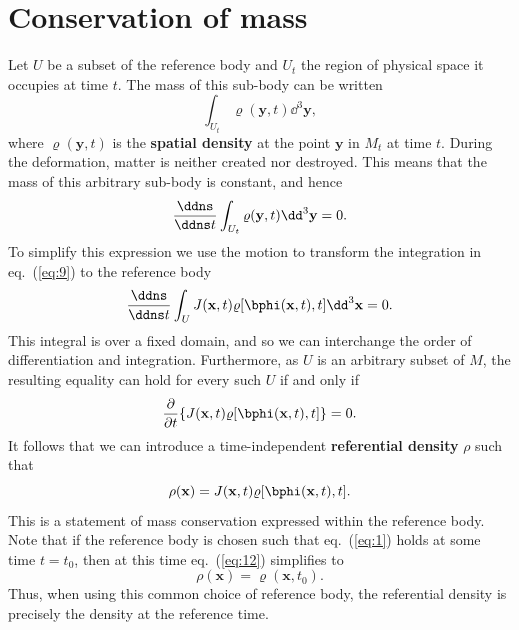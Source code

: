 \section*{Conservation of mass}
Let $U$ be a subset of the reference body and $U_{t}$ the region of physical space it occupies at time $t$. The mass of this 
sub-body can be written
\begin{equation}
\int_{U_{t}}\varrho(\mathbf{y},t)\dd^{3}\mathbf{y},
\label{eq:8}
\end{equation}
where $\varrho(\mathbf{y},t)$ is the \textbf{spatial density} at the point $\mathbf{y}$ in $M_{t}$ at time $t$. During the deformation, matter is 
neither created nor destroyed. This means that the mass of this arbitrary sub-body is constant, and hence 
\begin{equation}
\frac{\ddns}{\ddns t}\int_{U_{t}}\varrho(\mathbf{y},t)\dd^{3}\mathbf{y}=0.
\label{eq:9}
\end{equation}
To simplify this expression we use the motion to transform the integration in eq.~(\ref{eq:9}) to the reference body
\begin{equation}
\frac{\ddns}{\ddns t}\int_{U}J(\mathbf{x},t)\varrho[\bphi(\mathbf{x},t),t]\dd^{3}\mathbf{x}=0.
\label{eq:10}
\end{equation}
This integral is over a fixed domain, and so we can interchange the order of differentiation and integration. Furthermore, as 
$U$ is an arbitrary subset of $M$, the resulting equality can hold for every such $U$ if and only if
\begin{equation}
\frac{\partial}{\partial t}\{J(\mathbf{x},t)\varrho[\bphi(\mathbf{x},t),t]\}=0.
\label{eq:11}
\end{equation}
It follows that we can introduce a time-independent \textbf{referential density} $\rho$ such that
\begin{equation}
\rho(\mathbf{x})=J(\mathbf{x},t)\varrho[\bphi(\mathbf{x},t),t].
\label{eq:12}
\end{equation}
This is a statement of mass conservation expressed within the reference body. Note that if the reference body is chosen such 
that eq.~(\ref{eq:1}) holds at some time $t=t_{0}$, then at this time eq.~(\ref{eq:12}) simplifies to
\begin{equation}
\rho(\mathbf{x})=\varrho(\mathbf{x},t_{0}).
\label{eq:13}
\end{equation}
Thus, when using this common choice of reference body, the referential density is precisely the density at the reference time.

